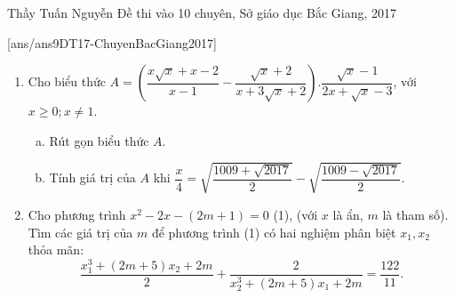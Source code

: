 \begin{name}
{Thầy  Tuấn Nguyễn}
{Đề thi vào 10 chuyên, Sở giáo dục Bắc Giang, 2017}
\end{name}
\setcounter{ex}{0}
[ans/ans9DT17-ChuyenBacGiang2017]

\begin{ex}%
    \hfill
\begin{enumerate}[1)]
        \item Cho biểu thức $A=\left(\dfrac{x\sqrt{x} + x - 2}{x - 1} - \dfrac{\sqrt{x} + 2}{x + 3\sqrt{x} + 2}\right). \dfrac{\sqrt{x} - 1}{2x + \sqrt{x} - 3}$, với $x\ge 0; x\ne 1$. 
		\begin{enumerate}[a)]
		\item Rút gọn biểu thức $A.$
		\item Tính giá trị của $A$ khi $\dfrac{x}{4}=\sqrt{\dfrac{1009 + \sqrt{2017}}{2}} - \sqrt{\dfrac{1009 - \sqrt{2017}}{2}}$. 
		\end{enumerate}
        \item Cho phương trình $x^2 - 2x - (2m + 1)=0$ (1), (với $x$ là ẩn, $m$ là tham số). Tìm các giá trị của $m$ để phương trình (1) có hai nghiệm phân biệt $x_1, x_2$ thỏa mãn: 
 $$\dfrac{x_1^3 + (2m + 5)x_2 + 2m}{2} + \dfrac{2}{x_2^3 + (2m + 5)x_1 + 2m}=\dfrac{122}{11}.$$
\end{enumerate}
\end{ex}
\loigiai
